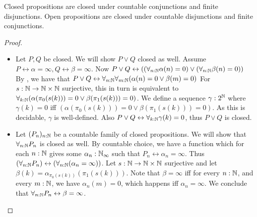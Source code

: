 \begin{lemma}\label{lemOpenClosedDisjunctionConjunction}
  Closed propositions are closed under countable conjunctions %
  and finite disjunctions.
  Open propositions are closed under countable disjunctions %
  and finite conjunctions. 
\end{lemma}
\begin{proof}
  \begin{itemize}
    \item Let $P,Q$ be closed. We will show $P\vee Q$ closed as well. 
      Assume $P\leftrightarrow \alpha = \infty, Q \leftrightarrow \beta = \infty$. 
      Now $P\vee Q \leftrightarrow 
      ((\forall_{n:\mathbb{N}} \alpha(n) = 0) 
      \vee (\forall_{n:\mathbb{N}} \beta(n) = 0))$
      By , we have that 
      $P\vee Q \leftrightarrow 
      \forall_{n:\mathbb{N}}  \forall_{m:\mathbb{N}}  (\alpha(n) = 0 \vee \beta(m) = 0)$
      For $s:\mathbb{N} \to \mathbb{N} \times \mathbb{N}$ surjective, 
      this in turn is equivalent to 
      $\forall_{k:\mathbb{N}}  (\alpha(\pi_0(s(k))) = 0 \vee \beta(\pi_1(s(k))) = 0)$. 
      We define a sequence $\gamma:2^{\mathbb{N}}$ where 
      $\gamma(k) = 0$ iff $(\alpha(\pi_0(s(k))) = 0 \vee \beta(\pi_1(s(k))) = 0)$. 
      As this is decidable, $\gamma$ is well-defined.
      Also
      $P\vee Q \leftrightarrow \forall_{k:\mathbb{N}} \gamma(k) = 0$, 
      thus $P\vee Q$ is closed. 
    \item Let $(P_n)_{n:\mathbb{N}}$ be a countable family of closed propositions. 
      We will show that 
      $\forall_{n:\mathbb{N}} P_n$ is closed as well. 
      By countable choice, we have a function which for each 
      $n:\mathbb{N}$ gives some $\alpha_n:\mathbb{N}_{\infty}$ 
      such that $P_n \leftrightarrow \alpha_n =\infty$. 
      Thus $(\forall_{n:\mathbb{N}} P_n )\leftrightarrow 
      (\forall_{n:\mathbb{N}}(\alpha_n = \infty))$. 
      Let $s:\mathbb{N} \to \mathbb{N} \times \mathbb{N}$ surjective and let 
      $\beta(k) = \alpha_{\pi_0(s(k))}(\pi_1 (s(k)))$. 
      Note that $\beta = \infty$ iff for every $n:\mathbb{N}$, 
      and every $m:\mathbb{N}$, we have $\alpha_n(m) = 0$, 
      which happens iff $\alpha_n = \infty$. 
      We conclude that $\forall_{n:\mathbb{N}} P_n \leftrightarrow \beta = \infty$.

\end{itemize}
\end{proof}
